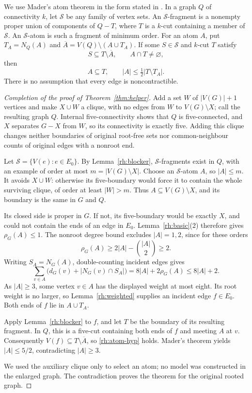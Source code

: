 We use Mader's atom theorem in the form stated in
\cite[Theorem~5]{KS2017}. In a graph $Q$ of connectivity $k$, let
$\mathcal S$ be any family of vertex sets. An $\mathcal S$-fragment
is a nonempty proper union of components of $Q-T$, where $T$ is a
$k$-cut containing a member of $\mathcal S$. An $\mathcal S$-atom
is such a fragment of minimum order. For an atom $A$, put
$T_A=N_Q(A)$ and $\overline A=V(Q)\setminus(A\cup T_A)$. If some
$S\in\mathcal S$ and $k$-cut $T$ satisfy
\begin{equation}\label{rh:atom-hyp}
 S\subseteq T\setminus\overline A,\qquad A\cap T\ne\varnothing,
\end{equation}
then
\begin{equation}\label{rh:atom-conclusion}
 A\subseteq T,\qquad |A|\le\tfrac12|T\setminus T_A|.
\end{equation}
There is no assumption that every edge is noncontractible.

\begin{proof}[Completion of the proof of Theorem~\ref{thm:helper}]
Add a set $W$ of $|V(G)|+1$ vertices and make $X\cup W$ a clique,
with no edges from $W$ to $V(G)\setminus X$; call the resulting graph
$Q$. Internal five-connectivity shows that $Q$ is five-connected, and
$X$ separates $G-X$ from $W$, so its connectivity is exactly five.
Adding this clique changes neither boundaries of original root-free
sets nor common-neighbour counts of original edges with a nonroot end.

Let $\mathcal S=\{V(e):e\in E_0\}$. By Lemma~\ref{rh:blocker},
$\mathcal S$-fragments exist in $Q$, with an example of order at most
$m=|V(G)\setminus X|$. Choose an $\mathcal S$-atom $A$, so
$|A|\le m$. It avoids $X\cup W$: otherwise its five-boundary would
force it to contain the whole surviving clique,
of order at least $|W|>m$. Thus $A\subseteq V(G)\setminus X$, and
its boundary is the same in $G$ and $Q$.

Its closed side is proper in $G$. If not, its five-boundary would be
exactly $X$, and could not contain the ends of an edge in $E_0$.
Lemma~\ref{rh:basic}(2) therefore gives $\rho_G(A)\le1$. The
nonroot degree bound excludes $|A|=1,2$, since for these orders
\[
 \rho_G(A)\ge2|A|-\binom{|A|}{2}\ge2.
\]
Writing $S_A=N_G(A)$, double-counting incident edges gives
\[
 \sum_{v\in A}\bigl(d_G(v)+|N_G(v)\cap S_A|\bigr)
   =8|A|+2\rho_G(A)\le8|A|+2.
\]
As $|A|\ge3$, some vertex $v\in A$ has the displayed weight at most
eight. Its root weight is no larger, so Lemma~\ref{rh:weighted}
supplies an incident edge $f\in E_0$. Both ends of $f$ lie in
$A\cup T_A$.

Apply Lemma~\ref{rh:blocker} to $f$, and let $T$ be the boundary of
its resulting fragment. In $Q$, this is a five-cut containing both
ends of $f$ and meeting $A$ at $v$. Consequently
$V(f)\subseteq T\setminus\overline A$, so \eqref{rh:atom-hyp} holds.
Mader's theorem yields $|A|\le5/2$, contradicting $|A|\ge3$.

We used the auxiliary clique only to select an atom; no model was
constructed in the enlarged graph. The contradiction proves the theorem
for the original rooted graph.
\end{proof}
